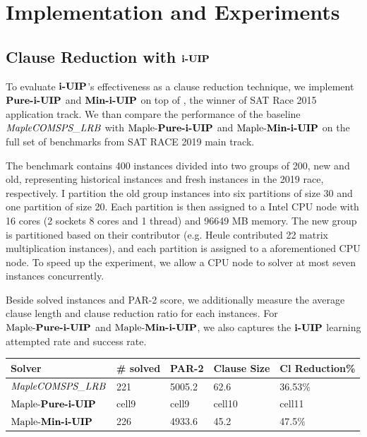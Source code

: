 \section{Implementation and Experiments}

\subsection{Clause Reduction with $\textbf{i-UIP}$}
To evaluate $\textbf{i-UIP}$'s effectiveness as a clause reduction technique, we implement  $\textbf{Pure-i-UIP}$ and $\textbf{Min-i-UIP}$  on top of \text{\MapleBase} \cite{}, the winner of SAT Race 2015 application track.  We than compare the performance of the baseline $\textit{MapleCOMSPS\_LRB}$ with $\text{Maple-\textbf{Pure-i-UIP}}$ and $\text{Maple-\textbf{Min-i-UIP}}$ on the full set of benchmarks from SAT RACE 2019 main track.

The benchmark contains 400 instances divided into two groups of 200, new and old, representing historical instances and fresh instances in the 2019 race, respectively. I partition the old group instances into six partitions of size 30 and one partition of size 20. Each partition is then assigned to a Intel CPU node with 16 cores (2 sockets 8 cores  and  1 thread) and 96649 MB memory. The new group is partitioned based on their contributor (e.g. Heule contributed 22 matrix multiplication instances), and each partition is assigned to a aforementioned CPU node. To speed up the experiment, we allow a CPU node to solver at most seven instances concurrently. 

Beside solved instances and PAR-2 score, we additionally measure the average clause length and clause reduction ratio for each instances. For $\text{Maple-\textbf{Pure-i-UIP}}$  and $\text{Maple-\textbf{Min-i-UIP}}$, we also captures the $\textbf{i-UIP}$ learning attempted rate and success rate.





\begin{center}
\begin{tabular}{ | m{3.5cm} | m{2cm}| m{2cm} | m{2cm} | m{2.5cm} | } 
\hline
Solver & \# solved & PAR-2 & Clause Size & Cl Reduction\% \\ 
\hline
$\textit{MapleCOMSPS\_LRB}$ & 221 & 5005.2 & 62.6 & 36.53\% \\ 
\hline
$\text{Maple-\textbf{Pure-i-UIP}}$ & cell9 & cell9 & cell10 & cell11\\ 
\hline
$\text{Maple-\textbf{Min-i-UIP}}$ & 226 & 4933.6 & 45.2 & 47.5\%\\ 
\hline
\end{tabular}
\end{center}


